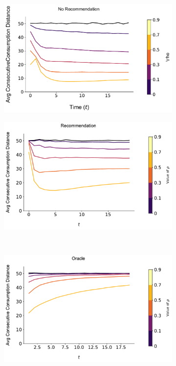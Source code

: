 \documentclass[format=acmsmall, review=true]{acmart}
\begin{document}
\begin{figure}[H]
\caption{Relationship between Local Consumption and $\rho$, $N = 200$}
\begin{subfigure}{.45\textwidth}
\includegraphics[width=\linewidth]{figures/rho_consumption_dist_N_200T_20.pdf}
\end{subfigure}
\begin{subfigure}{.45\textwidth}
\includegraphics[width=\linewidth]{figures/rho_consumption_dist_N_200T_20_partial.pdf}
\end{subfigure}\\
\begin{subfigure}{.45\textwidth}
\includegraphics[width=\linewidth]{figures/rho_consumption_dist_N_200T_20_omni.pdf}\\

\end{subfigure}
\end{figure}
\end{document}
